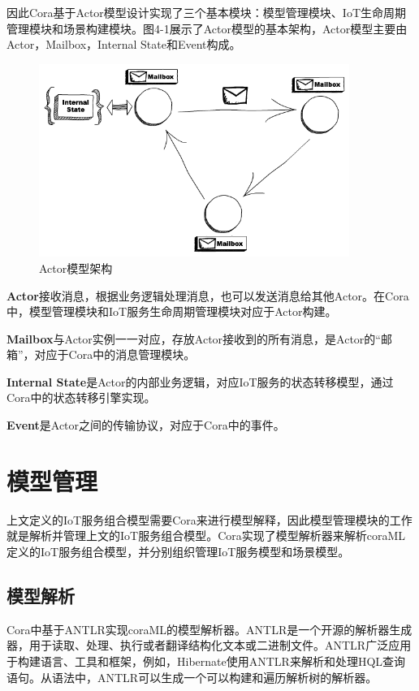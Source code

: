 \documentclass[winfonts,master,twoside]{njuthesis}
\begin{document}
因此Cora基于Actor模型设计实现了三个基本模块：模型管理模块、IoT生命周期管理模块和场景构建模块。图4-1展示了Actor模型的基本架构，Actor模型主要由Actor，Mailbox，Internal State和Event构成。
\begin{figure}
	\centering
	\includegraphics[width=0.9\textwidth]{figure/4-cora/actor_model.png}
	\caption{Actor模型架构\cite{actordef}}
	\label{ontransact-impl}
\end{figure}

\textbf{Actor}接收消息，根据业务逻辑处理消息，也可以发送消息给其他Actor。在Cora中，模型管理模块和IoT服务生命周期管理模块对应于Actor构建。

\textbf{Mailbox}与Actor实例一一对应，存放Actor接收到的所有消息，是Actor的“邮箱”，对应于Cora中的消息管理模块。

\textbf{Internal State}是Actor的内部业务逻辑，对应IoT服务的状态转移模型，通过Cora中的状态转移引擎实现。

\textbf{Event}是Actor之间的传输协议，对应于Cora中的事件。

\section{模型管理}
上文定义的IoT服务组合模型需要Cora来进行模型解释，因此模型管理模块的工作就是解析并管理上文的IoT服务组合模型。Cora实现了模型解析器来解析coraML定义的IoT服务组合模型，并分别组织管理IoT服务模型和场景模型。

\subsection{模型解析}
Cora中基于ANTLR实现coraML的模型解析器。ANTLR\cite{antlr}是一个开源的解析器生成器，用于读取、处理、执行或者翻译结构化文本或二进制文件。ANTLR广泛应用于构建语言、工具和框架，例如，Hibernate使用ANTLR来解析和处理HQL查询语句。从语法中，ANTLR可以生成一个可以构建和遍历解析树的解析器。
\end{document}
